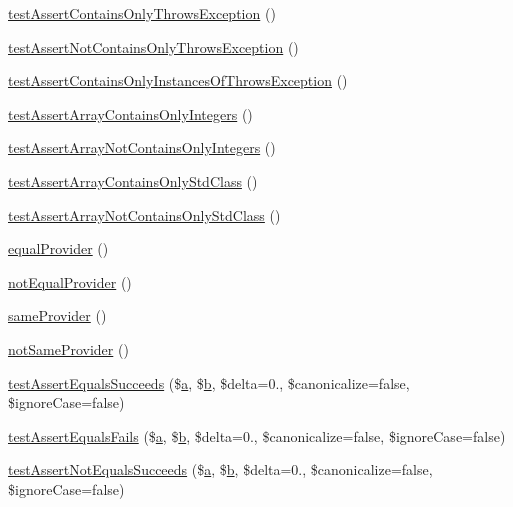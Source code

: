 \begin{DoxyCompactItemize}
\mbox{\hyperlink{class_framework___assert_test_ae82a4e03b01060c6adffd1e6d46b0c55}{test\+Assert\+Contains\+Only\+Throws\+Exception}} ()
\item 
\mbox{\hyperlink{class_framework___assert_test_a08f816c3208cc5e909f9dae53d958be4}{test\+Assert\+Not\+Contains\+Only\+Throws\+Exception}} ()
\item 
\mbox{\hyperlink{class_framework___assert_test_a7ba070aa37f164faa2e72d6349e936da}{test\+Assert\+Contains\+Only\+Instances\+Of\+Throws\+Exception}} ()
\item 
\mbox{\hyperlink{class_framework___assert_test_ad736d16a4a97f1ccfb8c9bb354b83a0e}{test\+Assert\+Array\+Contains\+Only\+Integers}} ()
\item 
\mbox{\hyperlink{class_framework___assert_test_a0c5c74aecc3a7f55451c4584403c7a64}{test\+Assert\+Array\+Not\+Contains\+Only\+Integers}} ()
\item 
\mbox{\hyperlink{class_framework___assert_test_a8555d42a52d95645269adc4fdf23df1b}{test\+Assert\+Array\+Contains\+Only\+Std\+Class}} ()
\item 
\mbox{\hyperlink{class_framework___assert_test_acaf86b33c2bfa56737124506176ed762}{test\+Assert\+Array\+Not\+Contains\+Only\+Std\+Class}} ()
\item 
\mbox{\hyperlink{class_framework___assert_test_a5381554302a939d7994742649a238e08}{equal\+Provider}} ()
\item 
\mbox{\hyperlink{class_framework___assert_test_a564fcbb9cace539210673467f8f5ce3b}{not\+Equal\+Provider}} ()
\item 
\mbox{\hyperlink{class_framework___assert_test_ab38cc27a6a9f5846c05931043271a43a}{same\+Provider}} ()
\item 
\mbox{\hyperlink{class_framework___assert_test_a5ed652fda096ff4429299389f5ebf31c}{not\+Same\+Provider}} ()
\item 
\mbox{\hyperlink{class_framework___assert_test_aee7c6c7296c8a25bd4b67e019e0c110f}{test\+Assert\+Equals\+Succeeds}} (\$\mbox{\hyperlink{interfacea}{a}}, \$\mbox{\hyperlink{interfaceb}{b}}, \$delta=0., \$canonicalize=false, \$ignore\+Case=false)
\item 
\mbox{\hyperlink{class_framework___assert_test_a152725252589799f3ada3ab42e66dbf2}{test\+Assert\+Equals\+Fails}} (\$\mbox{\hyperlink{interfacea}{a}}, \$\mbox{\hyperlink{interfaceb}{b}}, \$delta=0., \$canonicalize=false, \$ignore\+Case=false)
\item 
\mbox{\hyperlink{class_framework___assert_test_a4e21ad5e1468b3bac9532a1ddbbded19}{test\+Assert\+Not\+Equals\+Succeeds}} (\$\mbox{\hyperlink{interfacea}{a}}, \$\mbox{\hyperlink{interfaceb}{b}}, \$delta=0., \$canonicalize=false, \$ignore\+Case=false)

\end{DoxyCompactItemize}
